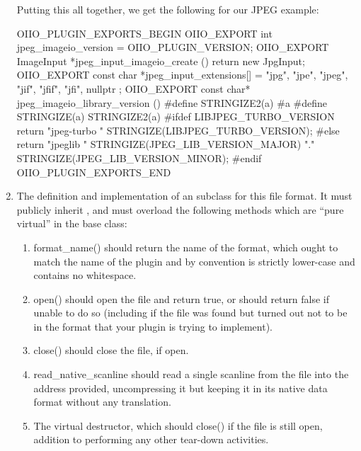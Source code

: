 \begin{enumerate}
  Putting this all together, we get the following for our JPEG example:

  \begin{code}
    OIIO_PLUGIN_EXPORTS_BEGIN
        OIIO_EXPORT int jpeg_imageio_version = OIIO_PLUGIN_VERSION;
        OIIO_EXPORT ImageInput *jpeg_input_imageio_create () {
            return new JpgInput;
        }
        OIIO_EXPORT const char *jpeg_input_extensions[] = {
            "jpg", "jpe", "jpeg", "jif", "jfif", "jfi", nullptr
        };
        OIIO_EXPORT const char* jpeg_imageio_library_version () {
          #define STRINGIZE2(a) #a
          #define STRINGIZE(a) STRINGIZE2(a)
          #ifdef LIBJPEG_TURBO_VERSION
            return "jpeg-turbo " STRINGIZE(LIBJPEG_TURBO_VERSION);
          #else
            return "jpeglib " STRINGIZE(JPEG_LIB_VERSION_MAJOR) "." \\
                    STRINGIZE(JPEG_LIB_VERSION_MINOR);
          #endif
        }
    OIIO_PLUGIN_EXPORTS_END
  \end{code}

\item The definition and implementation of an \ImageInput subclass for
  this file format.  It must publicly inherit \ImageInput, and must
  overload the following methods which are ``pure virtual'' in the
  \ImageInput base class:

  \begin{enumerate}
    \item {\cf format_name()} should return the name of the format, which
      ought to match the name of the plugin and by convention is
      strictly lower-case and contains no whitespace.
    \item {\cf open()} should open the file and return true, or should
      return false if unable to do so (including if the file was found
      but turned out not to be in the format that your plugin is trying
      to implement).
    \item {\cf close()} should close the file, if open.
    \item {\cf read_native_scanline} should read a single scanline from
      the file into the address provided, uncompressing it but
      keeping it in its native data format without any translation.
    \item The virtual destructor, which should {\cf close()} if the file
      is still open, addition to performing any other tear-down activities.
  \end{enumerate}
  

\end{enumerate}
